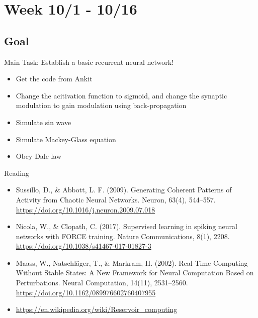 \documentclass[12pt, a4paper]{article}
\begin{document}
\newpage


\section*{Week 10/1 - 10/16}

\subsection*{Goal}

\noindent
Main Task: Establish a basic recurrent neural network!

\begin{itemize}
    \item Get the code from Ankit
    \item Change the acitivation function to sigmoid, and change the synaptic modulation to gain modulation using back-propagation
    \item Simulate sin wave
    \item Simulate Mackey-Glass equation
    \item Obey Dale law
\end{itemize}

\noindent
Reading

\begin{itemize}
    \item Sussillo, D., \& Abbott, L. F. (2009). Generating Coherent Patterns of Activity from Chaotic Neural Networks. Neuron, 63(4), 544–557. \url{https://doi.org/10.1016/j.neuron.2009.07.018}
    \item Nicola, W., \& Clopath, C. (2017). Supervised learning in spiking neural networks with FORCE training. Nature Communications, 8(1), 2208. \url{https://doi.org/10.1038/s41467-017-01827-3}
    \item Maass, W., Natschläger, T., \& Markram, H. (2002). Real-Time Computing Without Stable States: A New Framework for Neural Computation Based on Perturbations. Neural Computation, 14(11), 2531–2560. \url{https://doi.org/10.1162/089976602760407955}
    \item \url{https://en.wikipedia.org/wiki/Reservoir_computing}
\end{itemize}

\newpage
\end{document}
